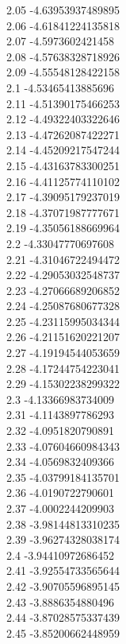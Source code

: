 {2.05	-4.63953937489895\\
2.06	-4.61841224135818\\
2.07	-4.5973602421458\\
2.08	-4.57638328718926\\
2.09	-4.55548128422158\\
2.1	-4.53465413885696\\
2.11	-4.51390175466253\\
2.12	-4.49322403322646\\
2.13	-4.47262087422271\\
2.14	-4.45209217547244\\
2.15	-4.43163783300251\\
2.16	-4.41125774110102\\
2.17	-4.39095179237019\\
2.18	-4.37071987777671\\
2.19	-4.35056188669964\\
2.2	-4.33047770697608\\
2.21	-4.31046722494472\\
2.22	-4.29053032548737\\
2.23	-4.27066689206852\\
2.24	-4.25087680677328\\
2.25	-4.23115995034344\\
2.26	-4.21151620221207\\
2.27	-4.19194544053659\\
2.28	-4.17244754223041\\
2.29	-4.15302238299322\\
2.3	-4.13366983734009\\
2.31	-4.1143897786293\\
2.32	-4.0951820790891\\
2.33	-4.07604660984343\\
2.34	-4.0569832409366\\
2.35	-4.03799184135701\\
2.36	-4.0190722790601\\
2.37	-4.0002244209903\\
2.38	-3.98144813310235\\
2.39	-3.96274328038174\\
2.4	-3.94410972686452\\
2.41	-3.92554733565644\\
2.42	-3.90705596895145\\
2.43	-3.8886354880496\\
2.44	-3.87028575337439\\
2.45	-3.85200662448959\\
}
